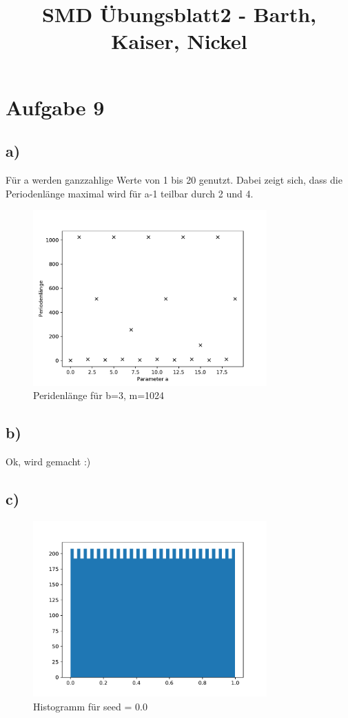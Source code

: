 

\title{SMD Übungsblatt2 - Barth, Kaiser, Nickel}



\section{Aufgabe 9}
\subsection{a)}
Für a werden ganzzahlige Werte von 1 bis 20 genutzt.
Dabei zeigt sich, dass die Periodenlänge maximal wird für 
a-1 teilbar durch 2 und 4. 

\begin{figure}[H]
  \centering
  \includegraphics[width=0.8\textwidth]{nr8_a.pdf}
  \caption{Peridenlänge für b=3, m=1024}
\end{figure}


\subsection{b)}
Ok, wird gemacht :)

\subsection{c)}
\begin{figure}[H]
  \centering
  \includegraphics[width=0.8\textwidth]{nr8_c_seed=0.0.pdf}
  \caption{Histogramm für seed = 0.0}
\end{figure}

